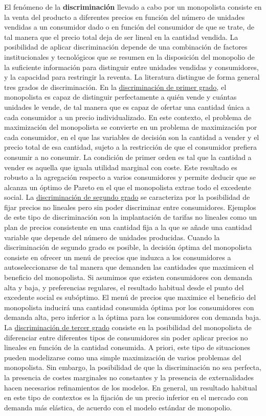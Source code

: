 \documentclass{nuevotema}
\begin{document}
El fenómeno de la \textbf{discriminación} llevado a cabo por un monopolista consiste en la venta del producto a diferentes precios en función del número de unidades vendidas a un consumidor dado o en función del consumidor de que se trate, de tal manera que el precio total deja de ser lineal en la cantidad vendida. La posibilidad de aplicar discriminación depende de una combinación de factores institucionales y tecnológicos que se resumen en la disposición del monopolio de la suficiente información para distinguir entre unidades vendidas y consumidores, y la capacidad para restringir la reventa. La literatura distingue de forma general tres grados de discriminación. En la \underline{discriminación de primer grado}, el monopolista es capaz de distinguir perfectamente a quién  vende y cuántas unidades le vende, de tal manera que es capaz de ofertar una cantidad única a cada consumidor a un precio individualizado. En este contexto, el problema de maximización del monopolista se convierte en un problema de maximización por cada consumidor, en el que las variables de decisión son la cantidad a vender y el precio total de esa cantidad, sujeto a la restricción de que el consumidor prefiera consumir a no consumir. La condición de primer orden es tal que la cantidad a vender es aquella que iguala utilidad marginal con coste. Este resultado es robusto a la agregación respecto a varios consumidores y permite deducir que se alcanza un óptimo de Pareto en el que el monopolista extrae todo el excedente social. La \underline{discriminación de segundo grado} se caracteriza por la posibilidad de fijar precios no lineales pero sin poder discriminar entre consumidores. Ejemplos de este tipo de discriminación son la implantación de tarifas no lineales como un plan de precios consistente en una cantidad fija a la que se añade una cantidad variable que depende del número de unidades producidas. Cuando la discriminación de segundo grado es posible, la decisión óptima del monopolista consiste en ofrecer un menú de precios que induzca a los consumidores a autoseleccionarse de tal manera que demanden las cantidades que maximicen el beneficio del monopolista. Si asumimos que existen consumidores con demanda alta y baja, y preferencias regulares, el resultado habitual desde el punto del excedente social es subóptimo. El menú de precios que maximice el beneficio del monopolista inducirá una cantidad consumida óptima por los consumidores con demanda alta, pero inferior a la óptima para los consumidores con demanda baja. La \underline{discriminación de tercer grado} consiste en la posibilidad del monopolista de diferenciar entre diferentes tipos de consumidores sin poder aplicar precios no lineales en función de la cantidad consumida. A priori, este tipo de situaciones pueden modelizarse como una simple maximización de varios problemas del monopolista. Sin embargo, la posibilidad de que la discriminación no sea perfecta, la presencia de costes marginales no constantes y la presencia de externalidades hacen necesarios refinamientos de los modelos. En general, un resultado habitual en este tipo de contextos es la fijación de un precio inferior en el mercado con demanda más elástica, de acuerdo con el modelo estándar de monopolio.
\end{document}
